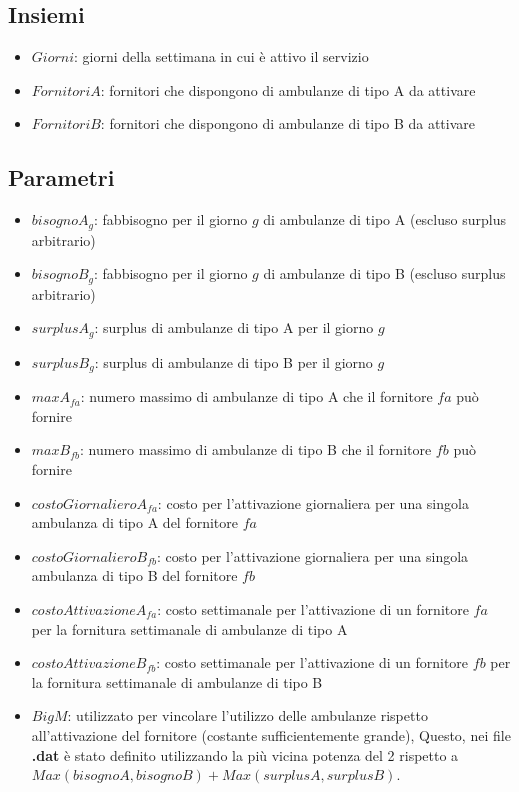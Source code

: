 \subsection{Insiemi}
\begin{itemize}
    \item $Giorni$: giorni della settimana in cui è attivo il servizio
    \item $FornitoriA$: fornitori che dispongono di ambulanze di tipo A da attivare
    \item $FornitoriB$: fornitori che dispongono di ambulanze di tipo B da attivare
\end{itemize}
\subsection{Parametri}
\begin{itemize}
    \item $bisognoA_{g}$: fabbisogno per il giorno $g$ di ambulanze di tipo A (escluso surplus arbitrario)
    \item $bisognoB_{g}$: fabbisogno per il giorno $g$ di ambulanze di tipo B (escluso surplus arbitrario)
    \item $surplusA_{g}$: surplus di ambulanze di tipo A per il giorno $g$
    \item $surplusB_{g}$: surplus di ambulanze di tipo B per il giorno $g$
    \item $maxA_{fa}$: numero massimo di ambulanze di tipo A che il fornitore $fa$ può fornire
    \item $maxB_{fb}$: numero massimo di ambulanze di tipo B che il fornitore $fb$ può fornire
    \item $costoGiornalieroA_{fa}$: costo per l'attivazione giornaliera per una singola ambulanza di tipo A del fornitore $fa$
    \item $costoGiornalieroB_{fb}$: costo per l'attivazione giornaliera per una singola ambulanza di tipo B del fornitore $fb$
    \item $costoAttivazioneA_{fa}$: costo settimanale per l'attivazione di un fornitore $fa$ per la fornitura settimanale di ambulanze di tipo A
    \item $costoAttivazioneB_{fb}$: costo settimanale per l'attivazione di un fornitore $fb$ per la fornitura settimanale di ambulanze di tipo B
    \item $BigM$: utilizzato per vincolare l'utilizzo delle ambulanze rispetto all'attivazione del fornitore (costante sufficientemente grande), Questo, nei file \textbf{.dat} è stato definito utilizzando la più vicina potenza del 2 rispetto a $Max(bisognoA, bisognoB) + Max(surplusA, surplusB)$.
\end{itemize}
